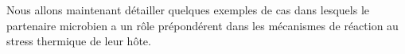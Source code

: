 Nous allons maintenant détailler quelques exemples de cas dans lesquels le
partenaire microbien a un rôle prépondérent dans les mécanismes de réaction au
stress thermique de leur hôte. 
